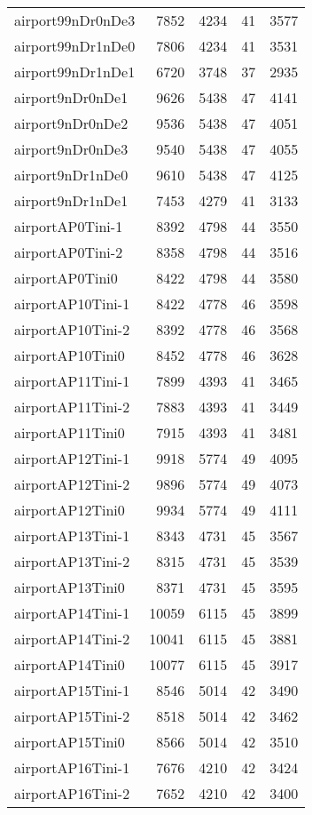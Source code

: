\begin{longtable}{lrrrr}
airport99nDr0nDe3 & 7852 & 4234 & 41 & 3577 \\
airport99nDr1nDe0 & 7806 & 4234 & 41 & 3531 \\
airport99nDr1nDe1 & 6720 & 3748 & 37 & 2935 \\
airport9nDr0nDe1 & 9626 & 5438 & 47 & 4141 \\
airport9nDr0nDe2 & 9536 & 5438 & 47 & 4051 \\
airport9nDr0nDe3 & 9540 & 5438 & 47 & 4055 \\
airport9nDr1nDe0 & 9610 & 5438 & 47 & 4125 \\
airport9nDr1nDe1 & 7453 & 4279 & 41 & 3133 \\
airportAP0Tini-1 & 8392 & 4798 & 44 & 3550 \\
airportAP0Tini-2 & 8358 & 4798 & 44 & 3516 \\
airportAP0Tini0 & 8422 & 4798 & 44 & 3580 \\
airportAP10Tini-1 & 8422 & 4778 & 46 & 3598 \\
airportAP10Tini-2 & 8392 & 4778 & 46 & 3568 \\
airportAP10Tini0 & 8452 & 4778 & 46 & 3628 \\
airportAP11Tini-1 & 7899 & 4393 & 41 & 3465 \\
airportAP11Tini-2 & 7883 & 4393 & 41 & 3449 \\
airportAP11Tini0 & 7915 & 4393 & 41 & 3481 \\
airportAP12Tini-1 & 9918 & 5774 & 49 & 4095 \\
airportAP12Tini-2 & 9896 & 5774 & 49 & 4073 \\
airportAP12Tini0 & 9934 & 5774 & 49 & 4111 \\
airportAP13Tini-1 & 8343 & 4731 & 45 & 3567 \\
airportAP13Tini-2 & 8315 & 4731 & 45 & 3539 \\
airportAP13Tini0 & 8371 & 4731 & 45 & 3595 \\
airportAP14Tini-1 & 10059 & 6115 & 45 & 3899 \\
airportAP14Tini-2 & 10041 & 6115 & 45 & 3881 \\
airportAP14Tini0 & 10077 & 6115 & 45 & 3917 \\
airportAP15Tini-1 & 8546 & 5014 & 42 & 3490 \\
airportAP15Tini-2 & 8518 & 5014 & 42 & 3462 \\
airportAP15Tini0 & 8566 & 5014 & 42 & 3510 \\
airportAP16Tini-1 & 7676 & 4210 & 42 & 3424 \\
airportAP16Tini-2 & 7652 & 4210 & 42 & 3400 \\

\end{longtable}
